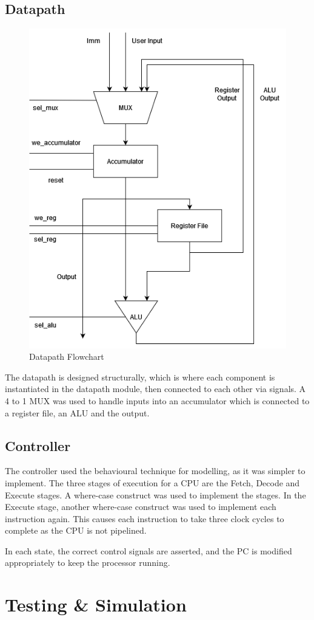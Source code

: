 \documentclass[12pt]{article}
\begin{document}
\subsection{Datapath}

\begin{figure}[H]
  \centering
  \includegraphics[width=0.5\linewidth]{datapath.png}
  \caption{Datapath Flowchart}
  \label{fig:datpath-diagram}
\end{figure}

The datapath is designed structurally, which is where each component is instantiated in the datapath module, then connected to each other via signals. A 4 to 1 MUX was used to handle inputs into an accumulator which is connected to a register file, an ALU and the output.

\subsection{Controller}

The controller used the behavioural technique for modelling, as it was simpler to implement. The three stages of execution for a CPU are the Fetch, Decode and Execute stages. A where-case construct was used to implement the stages. In the Execute stage, another where-case construct was used to implement each instruction again. This causes each instruction to take three clock cycles to complete as the CPU is not pipelined.

In each state, the correct control signals are asserted, and the PC is modified appropriately to keep the processor running.

\section{Testing \& Simulation}
\end{document}
